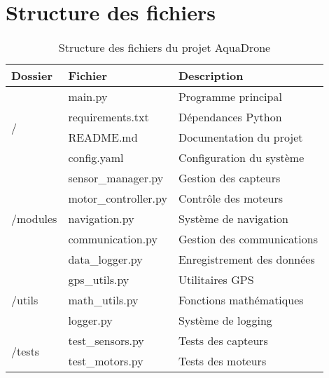 \section{Structure des fichiers}
\begin{table}[!htbp]
    \centering
    \caption{Structure des fichiers du projet AquaDrone}
    \label{tab:file-structure}
    \begin{tabular}{lll}
        \toprule
        \textbf{Dossier} & \textbf{Fichier} & \textbf{Description} \\
        \midrule
        \multirow{4}{*}{/} & main.py & Programme principal \\
        & requirements.txt & Dépendances Python \\
        & README.md & Documentation du projet \\
        & config.yaml & Configuration du système \\
        \midrule
        \multirow{5}{*}{/modules} & sensor\_manager.py & Gestion des capteurs \\
        & motor\_controller.py & Contrôle des moteurs \\
        & navigation.py & Système de navigation \\
        & communication.py & Gestion des communications \\
        & data\_logger.py & Enregistrement des données \\
        \midrule
        \multirow{3}{*}{/utils} & gps\_utils.py & Utilitaires GPS \\
        & math\_utils.py & Fonctions mathématiques \\
        & logger.py & Système de logging \\
        \midrule
        \multirow{2}{*}{/tests} & test\_sensors.py & Tests des capteurs \\
        & test\_motors.py & Tests des moteurs \\
        \bottomrule
    \end{tabular}
\end{table}

